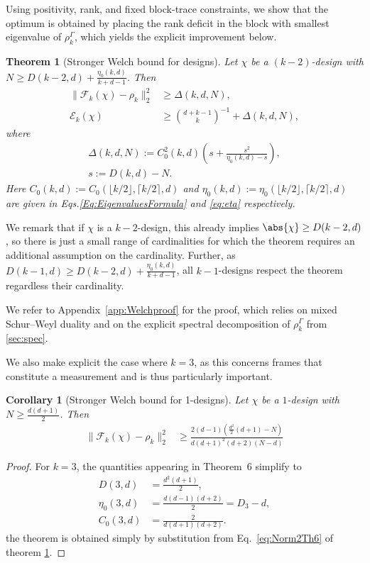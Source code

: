 \documentclass[aps,twocolumn,pra,superscriptaddress,nofootinbib]{revtex4-2}
\newtheorem{thm}{Theorem}
\newtheorem{corollary}{Corollary}
\begin{document}
Using positivity, rank, and fixed block-trace constraints, we show that the optimum is obtained by placing the rank deficit in the block with smallest eigenvalue of $\rho_k^{\mathsf{\Gamma}}$, which yields the explicit improvement below.

\begin{thm}[Stronger Welch bound for designs]\label{Th:VS-WB}
Let $\chi$ be a $(k-2)$-design with
$N\ge D(k-2,d)+\frac{\eta_{0}(k,d)}{k+d-1}$. Then
\begin{align} \label{eq:Norm2Th6}
\|\mathcal F_k(\chi)-\rho_k\|_2^2 &\ge \Delta(k,d,N),\\
\mathcal E_k(\chi) &\ge \binom{d+k-1}{k}^{-1} + \Delta(k,d,N),
\end{align}
where 
\begin{align}\label{eq:delta}
\Delta(k,d,N)
:= C_{0}^2(k,d)\left(s+\frac{s^{2}}{\eta_{0}(k,d)-s}\right),
\\ s:=D(k,d)-N.
\end{align}
Here $C_{0}(k,d) := C_{0}\!\left(\lfloor k/2 \rfloor, \lceil k/2 \rceil, d\right)$ 
and $\eta_{0}(k,d) := \eta_{0}\!\left(\lfloor k/2 \rfloor, \lceil k/2 \rceil, d\right)$ are given in Eqs.\eqref{Eq:EigenvaluesFormula} and \eqref{eq:eta} respectively.
\end{thm}

We remark that if $\chi$ is a $k-2$-design, this already implies $\abs{\chi}\geq D(k-2,d)$, so there is just a small range of cardinalities for which the theorem requires an additional assumption on the cardinality. Further, as $D(k-1,d)\geq D(k-2,d)+\frac{\eta_{0}(k,d)}{k+d-1}$, all $k-1$-designs respect the theorem regardless their cardinality.

We refer to Appendix~\ref{app:Welchproof} for the proof, which relies on mixed Schur--Weyl duality and on the
explicit spectral decomposition of $\rho_k^{\mathsf{\Gamma}}$ from \ref{sec:spec}.

{We also make explicit the case where $k=3$, as this concerns frames that constitute a measurement and is thus particularly important.
\begin{corollary}[Stronger Welch bound for 1-designs]\label{Th:VS-WB3}
Let $\chi$ be a $1$-design with
$N\ge \frac{d(d+1)}{2}$. Then
\begin{align}\label{Eq:VS-WB3}
\|\mathcal F_k(\chi)-\rho_k\|_2^2 &\ge \frac{2(d-1)(\frac{d^{2}}{2}(d+1)-N)}
{d(d+1)^{2}(d+2)(N-d)}
\end{align}
\end{corollary}
\begin{proof}
For $k=3$, the quantities appearing in Theorem~6 simplify to
\begin{align}
D(3,d)&=\frac{d^{2}(d+1)}{2},
\\
\eta_{0}(3,d)&=\frac{d(d-1)(d+2)}{2}=D_{3}-d, \\
C_{0}(3,d)&=\frac{2}{d(d+1)(d+2)}.
\end{align}
the theorem is obtained simply by substitution from Eq.~\eqref{eq:Norm2Th6} of theorem \ref{Th:VS-WB}. 
\end{proof}}
\end{document}
